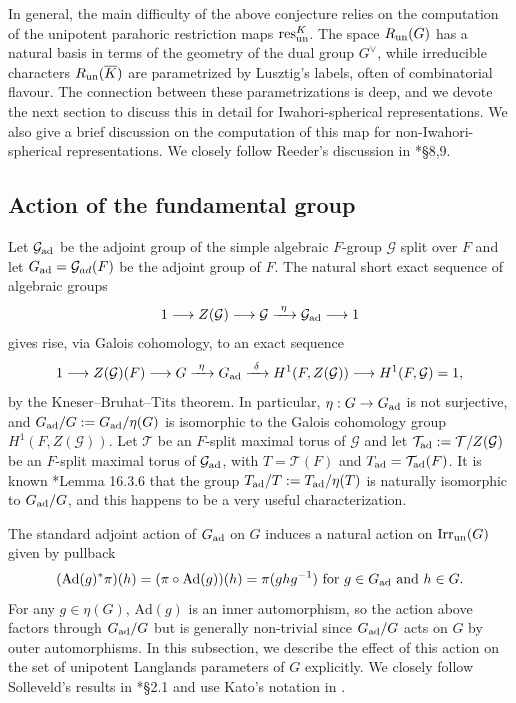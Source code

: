 In general, the main difficulty of the above conjecture relies on the computation of the unipotent parahoric restriction maps $\mathrm{res}^K_{\mathrm{un}}$. The space $R_{\mathrm{un}}(G)$ has a natural basis in terms of the geometry of the dual group $G^\vee$, while irreducible characters $R_{\mathrm{un}}(\overline{K})$ are parametrized by Lusztig's labels, often of combinatorial flavour. The connection between these parametrizations is deep, and we devote the next section to discuss this in detail for Iwahori-spherical representations. We also give a brief discussion on the computation of this map for non-Iwahori-spherical representations. We closely follow Reeder's discussion in \cite{Reeder2000}*{\S8,9}.

\subsection{Action of the fundamental group}

Let $\mathcal{G}_{\mathrm{ad}}$ be the adjoint group of the simple algebraic $F$-group $\mathcal{G}$ split over $F$ and let $G_{\mathrm{ad}}=\mathcal{G}_{ad}(F)$ be the adjoint group of $F$. The natural short exact sequence of algebraic groups 
$$1\longrightarrow Z(\mathcal{G})\longrightarrow\mathcal{G}\xrightarrow{\ \eta\ }\mathcal{G}_{\ad}\longrightarrow1$$
gives rise, via Galois cohomology, to an exact sequence
$$1\longrightarrow Z(\mathcal{G})(F)\longrightarrow G \xrightarrow{\ \eta\ }G_\ad\xrightarrow{\ \delta\ }H^1(F,Z(\mathcal{G}))\longrightarrow H^1(F,\mathcal{G})=1,$$
by the Kneser--Bruhat--Tits theorem. In particular, $\eta:G\to G_{\mathrm{ad}}$ is not surjective, and $G_{\mathrm{ad}}/G:=G_{\mathrm{ad}}/\eta(G)$ is isomorphic to the Galois cohomology group $H^1(F,Z(\mathcal{G}))$. Let $\mathcal{T}$ be an $F$-split maximal torus of $\mathcal{G}$ and let $\mathcal{T}_{\mathrm{ad}}:=\mathcal{T}/Z(\mathcal{G})$ be an $F$-split maximal torus of $\mathcal{G}_{\mathrm{ad}}$, with $T=\mathcal{T}(F)$ and $T_{\mathrm{ad}}=\mathcal{T}_{\mathrm{ad}}(F)$. It is known \cite{Springer1998}*{Lemma 16.3.6} that the group $T_{\mathrm{ad}}/T:=T_{\mathrm{ad}}/\eta(T)$ is naturally isomorphic to $G_{\mathrm{ad}}/G$, and this happens to be a very useful characterization.

The standard adjoint action of $G_{\mathrm{ad}}$ on $G$ induces a natural action on $\mathrm{Irr}_{\mathrm{un}}(G)$ given by pullback 
$$(\mathrm{Ad}(g)^*\pi)(h)=(\pi\circ\mathrm{Ad}(g))(h)=\pi(ghg^{-1})\text{ for }g\in G_{\mathrm{ad}}\text{ and } h\in G.$$ 
For any $g\in\eta(G)$, $\mathrm{Ad}(g)$ is an inner automorphism, so the action above factors through $G_{\mathrm{ad}}/G$ but is generally non-trivial since $G_{\mathrm{ad}}/G$ acts on $G$ by outer automorphisms. In this subsection, we describe the effect of this action on the set of unipotent Langlands parameters of $G$ explicitly. We closely follow Solleveld's results in \cite{Solleveld2020}*{\S2.1} and use Kato's notation in \cite{Kato1983}.

